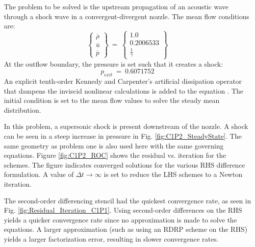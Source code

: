 \documentclass[conf]{new-aiaa}
\begin{document}
The problem to be solved is the upstream propagation of an acoustic wave through a shock wave in a convergent-divergent nozzle. The mean flow conditions are: 
\begin{equation*}
	\left\{
	\begin{matrix}
		\overline{\rho} \\
		\overline{u} \\
		\overline{p}
	\end{matrix}
	\right\}~=~
	\left\{
	\begin{matrix}
		1.0 \\
		0.2006533 \\
		\frac{1}{\gamma}
	\end{matrix}
	\right\}
\end{equation*}
At the outflow boundary, the pressure is set such that it creates a shock: 
\begin{equation*}
	p_{exit}~=~0.6071752
\end{equation*}
An explicit tenth-order Kennedy and Carpenter's artificial dissipation operator that dampens the inviscid nonlinear calculations is added to the equation \cite{Kennedy_Carp}. The initial condition is set to the mean flow values to solve the steady mean distribution. 

In this problem, a supersonic shock is present downstream of the nozzle.
A shock can be seen in a steep increase in pressure in Fig. \ref{fig:C1P2_SteadyState}. 
The same geometry as problem one is also used here with the same governing equations.
Figure \ref{fig:C1P2_ROC} shows the residual vs. iteration for the schemes. 
The figure indicates converged solutions for the various RHS difference formulation. 
A value of $\Delta{t}\to\infty$ is set to reduce the LHS schemes to a Newton iteration. 

The second-order differencing stencil had the quickest convergence rate, as seen in Fig. \ref{fig:Residual_Iteration_C1P1}. 
Using second-order differences on the RHS yields a quicker convergence rate since no approximation is made to solve the equations. 
A larger approximation (such as using an RDRP scheme on the RHS) yields a larger factorization error, resulting in slower convergence rates. 
\end{document}
